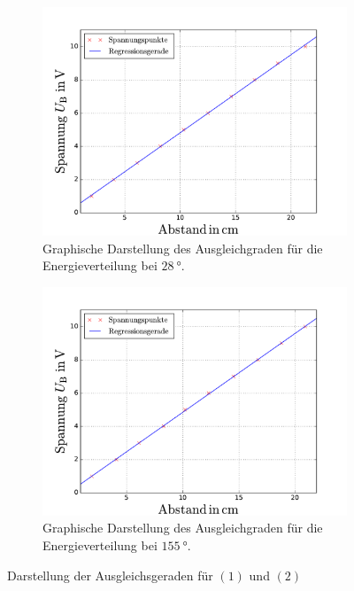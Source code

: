 \begin{figure}
  \centering
  \begin{subfigure}{0.48\textwidth}
    \centering
    \includegraphics[width=1 \textwidth]{../Messdaten/zim.pdf}
    \caption{Graphische Darstellung des Ausgleichgraden für die Energieverteilung bei $\SI{28}{\degree}$.}
    \label{fig: energie_zim}
  \end{subfigure}
  \begin{subfigure}{0.48\textwidth}
    \centering
    \includegraphics[width=1 \textwidth]{../Messdaten/spannungsfit_energieverteilung_150grad.pdf}
    \caption{Graphische Darstellung des Ausgleichgraden für die Energieverteilung bei $\SI{155}{\degree}$.}
    \label{fig: enrgie_hot}
  \end{subfigure}
  \caption{Darstellung der Ausgleichsgeraden für $(1)$ und $(2)$}
  \label{fig: darstellung_1}
\end{figure}
